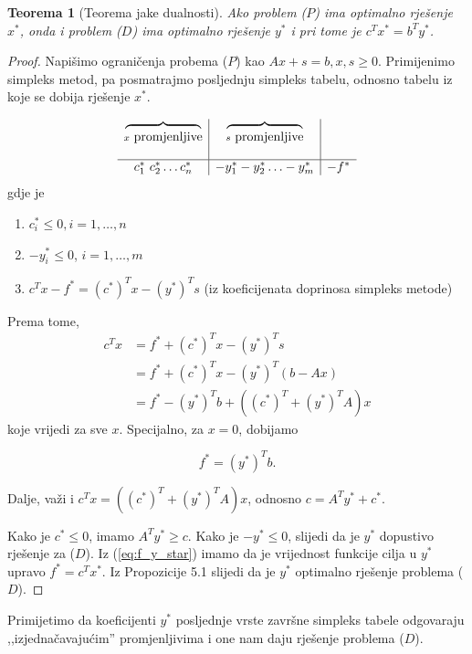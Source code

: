\documentclass[a4paper, utf8, 11pt, colorlinks]{book}
\newtheorem{thm}{Teorema}[chapter]
\theoremstyle{definition}
\begin{document}
\begin{thm}[Teorema jake dualnosti]
     Ako problem ($P$) ima optimalno rješenje $x^*$, onda i problem ($D$) ima optimalno rješenje $y^*$ i pri tome je $c^T x^* = b^T y^*$.
\end{thm}
\begin{proof}
         Napišimo ograničenja probema ($P$) kao $Ax + s = b, x, s \geq 0$.
         Primijenimo simpleks metod, pa posmatrajmo posljednju  simpleks tabelu, odnosno tabelu iz koje se dobija rješenje $x^*$.
         
         $$\begin{array}{c |c | c}
         \overbrace{\ \ \ \ \ \hspace{1.5cm}}_{x \mbox{ promjenljive}}     &  \overbrace{\ \ \ \ \ \hspace{1.5cm}}_{s \mbox{ promjenljive}} &   \\
                                                           & &   \\
         \hline
             c_1^*\ c_2^* \ldots c_n^*            & -y_1^* -y_2^* \ldots -y_m^*  & -f^*
         \end{array}
         $$
   gdje je 
   \begin{enumerate}
       \item    $c^*_i \leq 0, i = 1,\ldots, n$ 
       \item    $-y_i^* \leq 0$, $i = 1,\ldots, m$
       \item  $c^T x - f^* = (c^*)^T x - (y^*)^T s$ (iz koeficijenata doprinosa simpleks metode)
    \end{enumerate}
    Prema tome, 
    \begin{align*}
           c^T x &=  f^* + (c^*)^T x - (y^*)^T s \\
                 &=  f^* + (c^*)^T x - (y^*)^T (b - Ax) \\
                 &= f^*  - (y^*)^T b +   ((c^*)^T + (y^*)^T A ) x
    \end{align*}
    koje vrijedi za sve $x$. Specijalno, za  $x = 0$,  dobijamo 
    
    \begin{equation}\label{eq:f_y_star}
        f^* = (y^*)^T b.
    \end{equation}

Dalje, važi i $c^T x = ((c^*)^T + (y^*)^T A ) x$, odnosno     $ c = A^T y^* + c^*$. 
    
    Kako je $c^* \leq 0$, imamo  $A^T y^* \geq c$. Kako je $-y^* \leq 0$, slijedi da je $y^*$ dopustivo rješenje za  ($D$).  Iz (\ref{eq:f_y_star}) imamo da je vrijednost funkcije cilja u $y^*$ upravo $f^* = c^T x^* $. Iz Propozicije 5.1  slijedi da je $y^*$ optimalno rješenje problema  ($D$). 
 
    
\end{proof} 
Primijetimo da koeficijenti $y^*$ posljednje vrste završne simpleks tabele odgovaraju  ,,izjednačavajućim''   promjenljivima i one nam daju rješenje problema  ($D$).  
\end{document}

